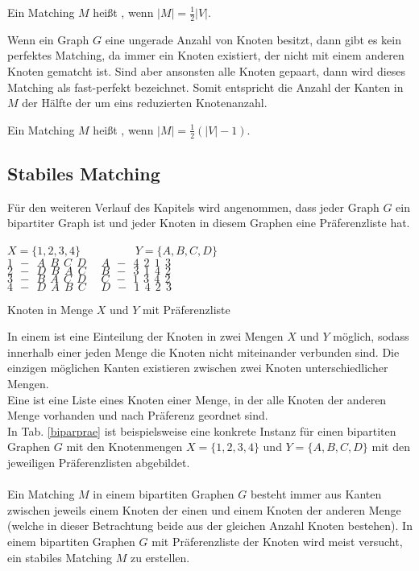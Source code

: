 \begin{df}
Ein Matching $M$ heißt , wenn $|M| = \frac{1}{2} |V|$.
\end{df}

\noindent Wenn ein Graph $G$ eine ungerade Anzahl von Knoten besitzt, dann gibt es kein perfektes Matching, da immer ein Knoten existiert, der nicht mit einem anderen Knoten gematcht ist. Sind aber ansonsten alle Knoten gepaart, dann wird dieses Matching als fast-perfekt bezeichnet. Somit entspricht die Anzahl der Kanten in $M$ der Hälfte der um eins reduzierten Knotenanzahl.

\begin{df}
Ein Matching $M$ heißt , wenn $|M| = \frac{1}{2} (|V| - 1)$.
\end{df}

\subsection{Stabiles Matching}
Für den weiteren Verlauf des Kapitels wird angenommen, dass jeder Graph $G$ ein bipartiter Graph ist und jeder Knoten in diesem Graphen eine Präferenzliste hat.

\begin{table}[ht]
\centering
$X=\{1,2,3,4\}$ \ \ \ \ \ \ \ \ \ $Y=\{A,B,C,D\}$
\\ \phantom{A}
$1 \ \ - \ \ A \ \ B \ \ C \ \ D \ \ \ \ \ \ A \ \ - \ \ 4 \ \ 2 \ \ 1 \ \ 3$
\\ $2 \ \ - \ \ D \ \ B \ \ A \ \ C \ \ \ \ \ \ B \ \ - \ \ 3 \ \ 1 \ \ 4 \ \ 2$
\\ $3 \ \ - \ \ B \ \ A \ \ C \ \ D \ \ \ \ \ \ C \ \ - \ \ 1 \ \ 3 \ \ 4 \ \ 2$
\\ $4 \ \ - \ \ D \ \ A \ \ B \ \ C \ \ \ \ \ \ D \ \ - \ \ 1 \ \ 4 \ \ 2 \ \ 3$

\caption{Knoten in Menge $X$ und $Y$ mit  Präferenzliste}
\label{biparprae}
\end{table} 

\phantom{A}
\noindent In einem  ist eine Einteilung der Knoten in zwei Mengen $X$ und $Y$ möglich, sodass innerhalb einer jeden Menge die Knoten nicht miteinander verbunden sind. Die einzigen möglichen Kanten existieren zwischen zwei Knoten unterschiedlicher Mengen. 
\\ Eine  ist eine Liste eines Knoten einer Menge, in der alle Knoten der anderen Menge vorhanden und nach Präferenz geordnet sind. 
\\ In Tab. \ref{biparprae} ist beispielsweise eine konkrete Instanz für einen bipartiten Graphen $G$ mit den Knotenmengen $X=\{1,2,3,4\}$ und $Y=\{A,B,C,D\}$ mit den jeweiligen Präferenzlisten abgebildet.
\\ \phantom{es}
\\ Ein Matching $M$ in einem bipartiten Graphen $G$ besteht immer aus Kanten zwischen jeweils einem Knoten der einen und einem Knoten der anderen Menge (welche in dieser Betrachtung beide aus der gleichen Anzahl Knoten bestehen). In einem bipartiten Graphen $G$ mit Präferenzliste der Knoten wird meist versucht, ein stabiles Matching $M$ zu erstellen. 

